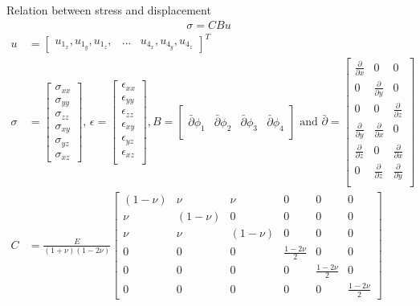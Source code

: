 \documentclass[screen]{beamer}
\begin{document}
\begin{frame}
Relation between stress and displacement
\begin{align*}
\sigma = C B u
\end{align*}
\tiny
\begin{align*}
u &= 
\begin{bmatrix}
u_{1_x}, u_{1_y}, u_{1_z}, &...&  u_{4_x}, u_{4_y}, u_{4_z}
\end{bmatrix}^T  \\
{\sigma} &=
\begin{bmatrix}
\sigma_{xx} \\
\sigma_{yy} \\
\sigma_{zz} \\
\sigma_{xy} \\
\sigma_{yz} \\
\sigma_{xz}
\end{bmatrix}, \,
{\epsilon} = 
\begin{bmatrix}
\epsilon_{xx} \\
\epsilon_{yy} \\
\epsilon_{zz} \\
\epsilon_{xy} \\
\epsilon_{yz} \\
\epsilon_{xz} \\
\end{bmatrix}, 
B = 
\begin{bmatrix} \\
\bar{{\partial}} {\phi_1} & \bar{{\partial}} {\phi_2} & \bar{{\partial}} {\phi_3} & \bar{{\partial}} {\phi_4} \\[1em]
\end{bmatrix} \textrm{ and } 
\bar{{\partial}} = 
\begin{bmatrix}
\frac{\partial}{\partial x} & 0 & 0 \\[0.3em]
0 & \frac{\partial}{\partial y} & 0 \\[0.3em]
0 & 0 & \frac{\partial}{\partial z} \\[0.3em]
\frac{\partial}{\partial y} & \frac{\partial}{\partial x} & 0 \\[0.3em]
\frac{\partial}{\partial z} & 0 & \frac{\partial}{\partial x}\\[0.3em]
0 & \frac{\partial}{\partial z} & \frac{\partial}{\partial y} \\
\end{bmatrix} \\
{C} &= \frac{E}{(1+\nu)(1-2\nu)}
\begin{bmatrix}
(1-\nu) & \nu & \nu & 0 & 0 & 0 \\
\nu & (1-\nu) & 0 & 0 & 0 & 0 \\
\nu & \nu & (1-\nu) & 0 & 0 & 0 \\
0 & 0 & 0 & \frac{1-2\nu}{2} & 0 & 0 \\
0 & 0 & 0 & 0 & \frac{1-2\nu}{2} & 0 \\
0 & 0 & 0 & 0 & 0 & \frac{1-2\nu}{2}
\end{bmatrix}
\end{align*}
\end{frame}
\end{document}
